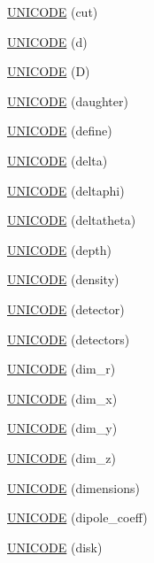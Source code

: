 \begin{DoxyCompactItemize}
\item 
\hyperlink{namespace_d_d4hep_1_1_x_m_l_a1dde75438831801262d7883f65f97435}{UNICODE} (cut)
\item 
\hyperlink{namespace_d_d4hep_1_1_x_m_l_a5f4b54a4badf26042f974751d080bc2a}{UNICODE} (d)
\item 
\hyperlink{namespace_d_d4hep_1_1_x_m_l_a063d918c9f7bc329c92e5904213e7afd}{UNICODE} (D)
\item 
\hyperlink{namespace_d_d4hep_1_1_x_m_l_a5e589c14c7bfdeb2f294317b5d4214b8}{UNICODE} (daughter)
\item 
\hyperlink{namespace_d_d4hep_1_1_x_m_l_adac17977c4019c0eac929423e3b8acc4}{UNICODE} (define)
\item 
\hyperlink{namespace_d_d4hep_1_1_x_m_l_acb3e7a8633cc0772b2d1f3e99cddc1db}{UNICODE} (delta)
\item 
\hyperlink{namespace_d_d4hep_1_1_x_m_l_ab0c5123d2399c4ce112e0ca91f1bfeff}{UNICODE} (deltaphi)
\item 
\hyperlink{namespace_d_d4hep_1_1_x_m_l_acefe8204b97c6e602b993e98368f9280}{UNICODE} (deltatheta)
\item 
\hyperlink{namespace_d_d4hep_1_1_x_m_l_ae9d57b3e1def56fa5e6a1399ae974c60}{UNICODE} (depth)
\item 
\hyperlink{namespace_d_d4hep_1_1_x_m_l_a1ced206794b90b58397092707dff1bf1}{UNICODE} (density)
\item 
\hyperlink{namespace_d_d4hep_1_1_x_m_l_ab73d6563cf5e1aa36db067b3f34bd88f}{UNICODE} (detector)
\item 
\hyperlink{namespace_d_d4hep_1_1_x_m_l_a1f5ae3719f4865d4b02790e630d5f390}{UNICODE} (detectors)
\item 
\hyperlink{namespace_d_d4hep_1_1_x_m_l_ad856ff15b771c2efa5e93c75b751ba04}{UNICODE} (dim\_\-r)
\item 
\hyperlink{namespace_d_d4hep_1_1_x_m_l_adf88fd89648b4bd7232f8c9fedd52d29}{UNICODE} (dim\_\-x)
\item 
\hyperlink{namespace_d_d4hep_1_1_x_m_l_aa0d75523b6d65266fed937fd82b2cf95}{UNICODE} (dim\_\-y)
\item 
\hyperlink{namespace_d_d4hep_1_1_x_m_l_a3abc4c62078547befb261956ff0446d3}{UNICODE} (dim\_\-z)
\item 
\hyperlink{namespace_d_d4hep_1_1_x_m_l_af4d7437f2425852ea22220b7d1e8393c}{UNICODE} (dimensions)
\item 
\hyperlink{namespace_d_d4hep_1_1_x_m_l_a0f1f224621ec7e709b21ca1b75e7ebbc}{UNICODE} (dipole\_\-coeff)
\item 
\hyperlink{namespace_d_d4hep_1_1_x_m_l_a5631e45a013c4bedc382122d95d3f4fc}{UNICODE} (disk)

\end{DoxyCompactItemize}
